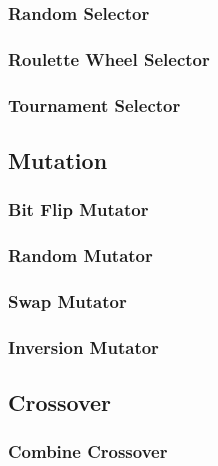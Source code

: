       \subsubsection{Random Selector}
      \label{sec:keen:operators:selection:random}
        \Blindtext
      \subsubsection{Roulette Wheel Selector}
      \label{sec:keen:operators:selection:roulette_wheel}
        \Blindtext
      \subsubsection{Tournament Selector}
      \label{sec:keen:operators:selection:tournament}
        \Blindtext
    \subsection{Mutation}
    \label{sec:keen:operators:mutation}
      \subsubsection{Bit Flip Mutator}
      \label{sec:keen:operators:mutation:bit_flip}
        \Blindtext
      \subsubsection{Random Mutator}
      \label{sec:keen:operators:mutation:simple}
        \Blindtext
      \subsubsection{Swap Mutator}
      \label{sec:keen:operators:mutation:swap}
        \Blindtext
      \subsubsection{Inversion Mutator}
      \label{sec:keen:operators:mutation:inversion}
        \Blindtext
    \subsection{Crossover}
    \label{sec:keen:operators:crossover}
      \subsubsection{Combine Crossover}
      \label{sec:keen:operators:crossover:combine}
        \Blindtext
